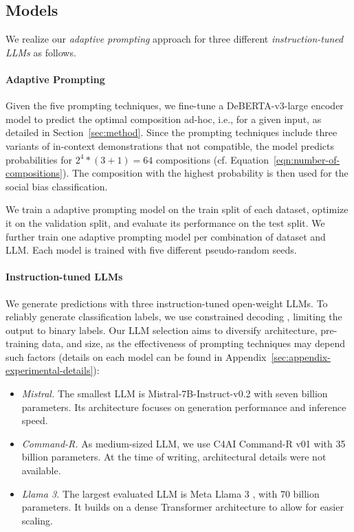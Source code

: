 \subsection{Models}

We realize our \emph{adaptive prompting} approach for three different \emph{instruction-tuned LLMs} as follows.


\paragraph{Adaptive Prompting}
Given the five prompting techniques, we fine-tune a DeBERTA-v3-large encoder model \cite{he2023} to predict the optimal composition ad-hoc, i.e., for a given input, as detailed in Section~\ref{sec:method}. Since the prompting techniques include three variants of in-context demonstrations that not compatible, the model predicts probabilities for $2^{4} * (3 + 1) = 64$ compositions (cf. Equation~\ref{eqn:number-of-compositions}). The composition with the highest probability is then used for the social bias classification.

We train a adaptive prompting model on the train split of each dataset, optimize it on the validation split, and evaluate its performance on the test split. We further train one adaptive prompting model per combination of dataset and LLM. Each model is trained with five different pseudo-random seeds.


\paragraph{Instruction-tuned LLMs}
We generate predictions with three instruction-tuned open-weight LLMs. To reliably generate classification labels, we use constrained decoding \cite{beck2024}, limiting the output to binary labels. Our LLM selection aims to diversify architecture, pre-training data, and size, as the effectiveness of prompting techniques may depend such factors (details on each model can be found in Appendix~\ref{sec:appendix-experimental-details}):
\begin{itemize}
\setlength{\itemsep}{0pt}
\item
\emph{Mistral.} The smallest LLM is Mistral-7B-Instruct-v0.2 \cite{jiang2023} with seven billion parameters. Its architecture focuses on generation performance and inference speed.
\item
\emph{Command-R.} As medium-sized LLM, we use C4AI Command-R v01 \cite{cohereforai2024} with 35 billion parameters. At the time of writing, architectural details were not available.
\item
\emph{Llama 3.} The largest evaluated LLM is Meta Llama 3 \cite{dubey2024}, with 70 billion parameters. It builds on a dense Transformer architecture to allow for easier scaling.
\end{itemize}



